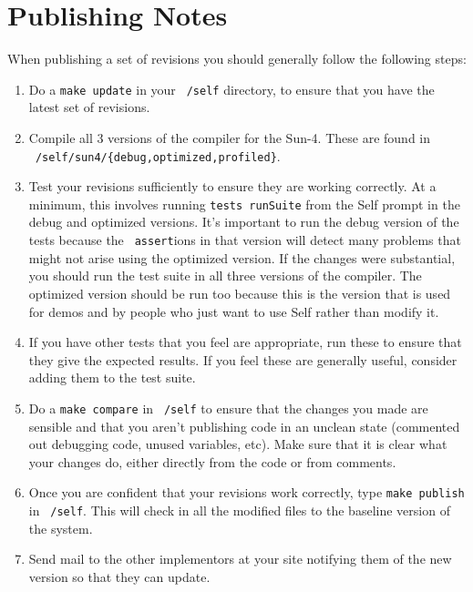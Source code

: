 \section{Publishing Notes}
When publishing a set of revisions you should generally follow the
following steps:
\begin{enumerate}
\item Do a {\tt make update} in your {\tt ~/self} directory, to ensure
that you have the latest set of revisions.

\item Compile all 3 versions of the compiler for the Sun-4.  These are
found in {\tt ~/self/sun4/\{debug,optimized,profiled\}}.

\item Test your revisions sufficiently to ensure they are working
correctly.  At a minimum, this involves running {\tt tests runSuite}
from the Self prompt in the debug and optimized versions.  It's
important to run the debug version of the tests because the {\tt
assert}ions in that version will detect many problems that might not
arise using the optimized version.  If the changes were substantial,
you should run the test suite in all three versions of the compiler.
The optimized version should be run too because this is the version
that is used for demos and by people who just want to use Self rather
than modify it.

\item If you have other tests that you feel are appropriate, run
these to ensure that they give the expected results.  If you feel
these are generally useful, consider adding them to the test suite.

\item Do a {\tt make compare} in {\tt ~/self} to ensure that the
changes you made are sensible and that you aren't publishing code in
an unclean state (commented out debugging code, unused variables,
etc).  Make sure that it is clear what your changes do, either
directly from the code or from comments.

\item Once you are confident that your revisions work correctly, type 
{\tt make publish} in {\tt ~/self}.  This will check in all the
modified files to the baseline version of the system.

\item Send mail to the other implementors at your site notifying them
of the new version so that they can update.
\end{enumerate}

